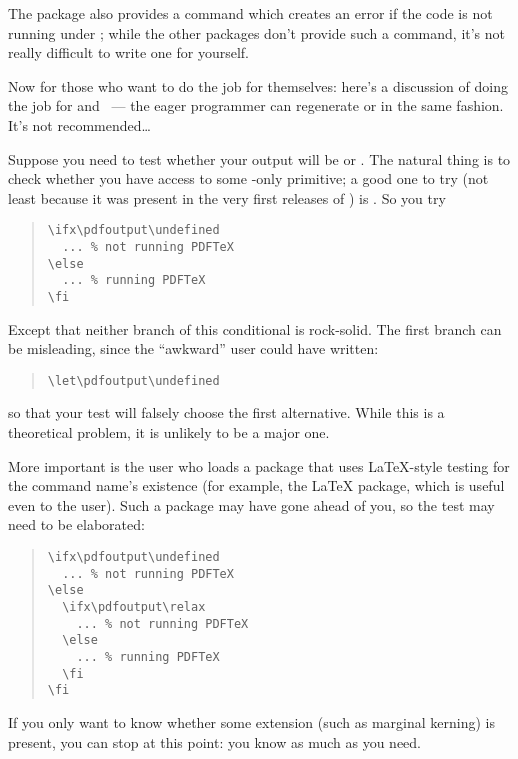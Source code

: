 The  package also provides a command
 which creates an error if the code is not running
under \xetex{}; while the other packages don't provide such a command,
it's not really difficult to write one for yourself.


Now for those who want to do the job for themselves: here's a
discussion of doing the job for \pdftex{} and ~--- the
eager programmer can regenerate  or  in the
same fashion.  It's not recommended\dots

Suppose you need to test whether your output will be  or
.  The natural thing is to check whether you have access to
some \PDFTeX{}-only primitive; a good one to try (not least because it
was present in the very first releases of \PDFTeX{}) is
.  So you try
\begin{quote}
\begin{verbatim}
\ifx\pdfoutput\undefined
  ... % not running PDFTeX
\else
  ... % running PDFTeX
\fi
\end{verbatim}
\end{quote}
Except that neither branch of this conditional is rock-solid.  The
first branch can be misleading, since the ``awkward'' user could have
written:
\begin{quote}
\begin{verbatim}
\let\pdfoutput\undefined
\end{verbatim}
\end{quote}
so that your test will falsely choose the first alternative.  While
this is a theoretical problem, it is unlikely to be a major one.

More important is the user who loads a package that uses
\LaTeX{}-style testing for the command name's existence (for example,
the \LaTeX{}  package, which is useful even to the
\plaintex{} user).  Such a package may have gone ahead of you, so the
test may need to be elaborated:
\begin{quote}
\begin{verbatim}
\ifx\pdfoutput\undefined
  ... % not running PDFTeX
\else
  \ifx\pdfoutput\relax
    ... % not running PDFTeX
  \else
    ... % running PDFTeX
  \fi
\fi
\end{verbatim}
\end{quote}
If you only want to know whether some \PDFTeX{} extension (such as
marginal kerning) is present, you can stop at this point: you know as
much as you need.

